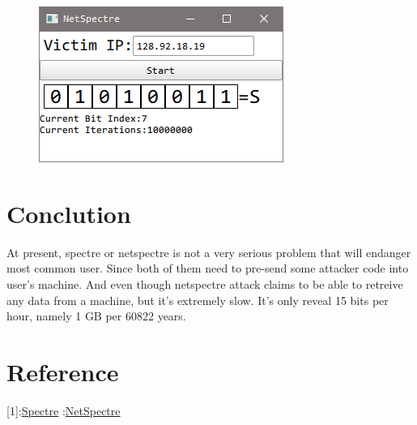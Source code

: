 \documentclass{article}
\begin{document}
\begin{figure}[H]\centering\includegraphics{04.png}\end{figure}
\section{Conclution}
At present, spectre or netspectre is not a very serious problem that will endanger most common user. Since both of them need to pre-send some attacker code into user's machine. And even though netspectre attack claims to be able to retreive any data from a machine, but it's extremely slow. It's only reveal 15 bits per hour, namely 1 GB per 60822 years.
\section{Reference}
[1]:\href{https://spectreattack.com/spectre.pdf}{Spectre}
\newline
[2]:\href{https://arxiv.org/pdf/1807.10535.pdf}{NetSpectre}
\end{document}
